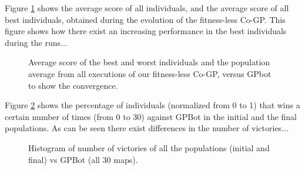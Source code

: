 \documentclass[conference]{IEEEtran}
\begin{document}

Figure \ref{figura:convergence} shows the average score of all individuals, and the average score of all best individuals, obtained during the evolution of the fitness-less Co-GP.
This figure shows how there exist an increasing performance in the best individuals during the runs...

\begin{figure}[htb]
\tiny
\begin{center}
\end{center}
\caption{Average score of the best and worst individuals and the
  population average from all executions of our fitness-less Co-GP,
  versus GPbot to show the convergence.} %
\label{figura:convergence}
\end{figure}





Figure \ref{figura:Victories_VS_GPBot_AllMaps} shows the percentage of individuals (normalized  from 0 to 1) that wins a certain number of times (from 0 to 30) against GPBot in the initial and the final populations. As can be seen there exist differences in the number of victories...

\begin{figure}[htb]
\tiny
\begin{center}
\end{center}
\caption{Histogram of number of victories of all the populations (initial and final) vs GPBot (all 30 maps).}
\label{figura:Victories_VS_GPBot_AllMaps}
\end{figure}
\end{document}
